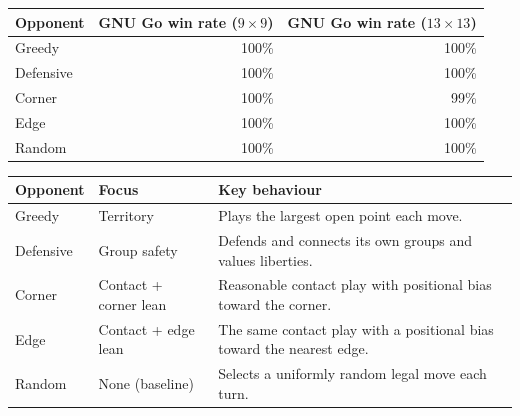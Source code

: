 \documentclass[sigconf,nonacm]{acmart}
\begin{document}
\begin{center}
\centering
  \small
  \begin{tabular}{@{}lrr@{}}
    \toprule
    Opponent   & GNU Go win rate ($9{\times}9$) & GNU Go win rate ($13{\times}13$) \\
    \midrule
    Greedy     & 100\% & 100\% \\
    Defensive  & 100\% & 100\% \\
    Corner     & 100\% & 99\%  \\
    Edge       & 100\% & 100\% \\
    Random     & 100\% & 100\% \\
    \bottomrule
  \end{tabular}
  \label{tab:gnugo}
\end{center}

\begin{center}
\centering
  \begin{tabular}{@{}llp{}@{}}
    \toprule
    Opponent & Focus & Key behaviour \\
    \midrule
    Greedy    & Territory              & Plays the largest open point each move. \\
    Defensive & Group safety           & Defends and connects its own groups and values liberties. \\
    Corner    & Contact + corner lean  & Reasonable contact play with positional bias toward the corner. \\
    Edge      & Contact + edge lean    & The same contact play with a positional bias toward the nearest edge. \\
    Random    & None (baseline)        & Selects a uniformly random legal move each turn. \\
    \bottomrule
  \end{tabular}
  \label{tab:opponents}
\end{center}
\end{document}

